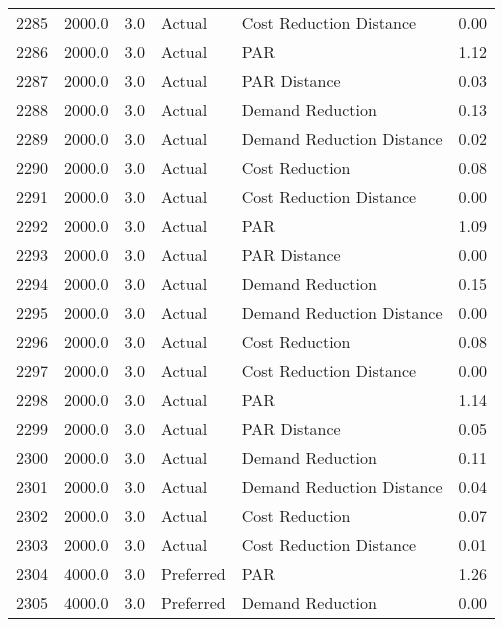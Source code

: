 \begin{longtable}{lrrllr}
2285 &       2000.0 &     3.0 &         Actual &    Cost Reduction Distance &   0.00 \\
2286 &       2000.0 &     3.0 &         Actual &                        PAR &   1.12 \\
2287 &       2000.0 &     3.0 &         Actual &               PAR Distance &   0.03 \\
2288 &       2000.0 &     3.0 &         Actual &           Demand Reduction &   0.13 \\
2289 &       2000.0 &     3.0 &         Actual &  Demand Reduction Distance &   0.02 \\
2290 &       2000.0 &     3.0 &         Actual &             Cost Reduction &   0.08 \\
2291 &       2000.0 &     3.0 &         Actual &    Cost Reduction Distance &   0.00 \\
2292 &       2000.0 &     3.0 &         Actual &                        PAR &   1.09 \\
2293 &       2000.0 &     3.0 &         Actual &               PAR Distance &   0.00 \\
2294 &       2000.0 &     3.0 &         Actual &           Demand Reduction &   0.15 \\
2295 &       2000.0 &     3.0 &         Actual &  Demand Reduction Distance &   0.00 \\
2296 &       2000.0 &     3.0 &         Actual &             Cost Reduction &   0.08 \\
2297 &       2000.0 &     3.0 &         Actual &    Cost Reduction Distance &   0.00 \\
2298 &       2000.0 &     3.0 &         Actual &                        PAR &   1.14 \\
2299 &       2000.0 &     3.0 &         Actual &               PAR Distance &   0.05 \\
2300 &       2000.0 &     3.0 &         Actual &           Demand Reduction &   0.11 \\
2301 &       2000.0 &     3.0 &         Actual &  Demand Reduction Distance &   0.04 \\
2302 &       2000.0 &     3.0 &         Actual &             Cost Reduction &   0.07 \\
2303 &       2000.0 &     3.0 &         Actual &    Cost Reduction Distance &   0.01 \\
2304 &       4000.0 &     3.0 &      Preferred &                        PAR &   1.26 \\
2305 &       4000.0 &     3.0 &      Preferred &           Demand Reduction &   0.00 \\

\end{longtable}
